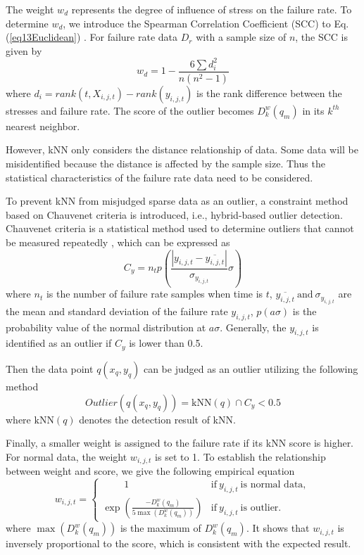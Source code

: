 \documentclass[journal,twoside,web]{ieeecolor}
\begin{document}
The weight $ w_{d} $ represents the degree of influence of stress on the failure rate. To determine $ w_{d} $, we introduce the Spearman Correlation Coefficient (SCC) to  Eq. (\ref{eq13Euclidean}) \cite{8374923}. For failure rate data $ D_{r} $ with a sample size of $ n $, the SCC is given by
\begin{equation}\label{eq14spearman}
w_{d} = 1 - \frac{6\sum{d_{i}^{2}}}{ n(n^{2}-1) }
\end{equation}
where $ d_{i} = rank(t,  X_{i,j,t} ) - rank(y_{i,j,t}) $ is the rank difference between the stresses and failure rate. The score of the outlier becomes $ D_{k}^{w}(q_{m}) $ in its $ k^{th} $ nearest neighbor. 

However, kNN only considers the distance relationship of data. Some data will be misidentified because the distance is affected by the sample size. Thus the statistical characteristics of the failure rate data need to be considered. 

To prevent kNN from misjudged sparse data as an outlier, a constraint method based on Chauvenet criteria is introduced, i.e., hybrid-based outlier detection. Chauvenet criteria is a statistical method used to determine outliers that cannot be measured repeatedly \cite{5976081}, which can be expressed as
\begin{equation}\label{eq15Chauvenet}
C_{y} = n_{t}p(\frac{ |y_{i,j,t} - \overline{y_{i,j,t}} |}{\sigma_{y_{i,j,t}}}\sigma)
\end{equation}
where $ n_{t} $ is the number of failure rate samples when time is $ t $, $ \overline{y_{i,j,t}} ~ \text{and} ~ \sigma_{y_{i,j,t}}$  are the mean and standard deviation of the  failure rate $ y_{i,j,t} $, $ p(a\sigma) $ is the probability value of the normal distribution at $ a\sigma $. Generally, the $ y_{i,j,t} $  is identified as an outlier if $ C_{y} $ is lower than 0.5.

Then the data point $ q(x_{q}, y_{q}) $ can be judged as an outlier utilizing the following method
\begin{equation}\label{eq16Hybrid}
Outlier(q(x_{q}, y_{q})) = \text{kNN}(q) \cap C_{y} < 0.5
\end{equation}
where $ \text{kNN}(q) $ denotes the detection result of kNN. 

Finally, a smaller weight is assigned to the failure rate if its kNN score is higher. For normal data, the weight $ w_{i,j,t} $ is set to 1. To establish the relationship between weight and score, we give the following empirical equation
\begin{equation}\label{eq17weight}
w_{i,j,t} = \begin{cases}
~~~~~~~~~~1  & \text{if} ~ y_{i,j,t} ~ \text{is normal data},   \\
\exp(\frac{-D_{k}^{w}(q_{m})}{5\max(D_{k}^{w}(q_{m}))} ) & \text{if}~ y_{i,j,t} ~ \text{is outlier}.
\end{cases}
\end{equation}
where $ \max(D_{k}^{w}(q_{m})) $ is the maximum of $ D_{k}^{w}(q_{m}) $. It shows that $ w_{i,j,t} $ is inversely proportional to the score, which is consistent with the expected result.
\end{document}
